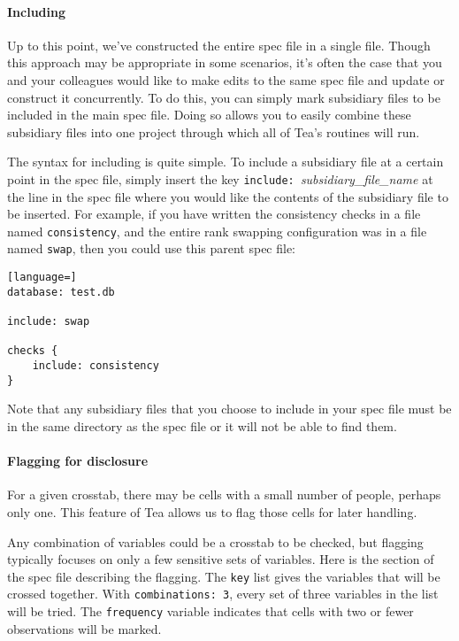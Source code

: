 \documentclass{article}
\begin{document}
\paragraph{Including} Up to this point, we've constructed the entire spec file in a single file. 
Though this approach may 
be appropriate in some scenarios, it's often the case that you and your colleagues would like to make 
edits to the same spec file and update or construct it concurrently. To do this, you can simply mark 
subsidiary files to be included in the main spec file. Doing so allows you to easily combine these 
subsidiary files into one project through which all of Tea's routines will run.

The syntax for including is quite simple. To include a subsidiary file at a certain point in the spec 
file, simply insert the key {\tt include: }\textit{subsidiary\_file\_name} at the line in the spec 
file where you would like the contents of the subsidiary file to be inserted. For example, if you have 
written the consistency checks in a file named {\tt consistency}, and the entire rank swapping 
configuration was in a file named {\tt swap}, then you could use this parent spec file:

\begin{lstlisting}[language=]
database: test.db

include: swap

checks {
    include: consistency
}
\end{lstlisting}

Note that any subsidiary files that you choose to include in your spec file must be in the same 
directory as the spec file or it will not be able to find them.

\paragraph{Flagging for disclosure} For a given crosstab, there may be cells with a small number of 
people, perhaps only one. This feature of Tea allows us to flag those cells for later handling.

Any combination of variables could be a crosstab to be checked, but flagging
typically focuses on only a few sensitive sets of variables. Here is the section
of the spec file describing the flagging. The {\tt key} list gives the variables
that will be crossed together. With {\tt combinations: 3}, every set of three
variables in the list will be tried. The {\tt frequency} variable indicates that
cells with two or fewer observations will be marked.
\end{document}
